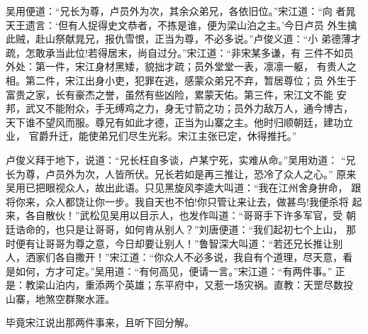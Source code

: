 吴用便道：“兄长为尊，卢员外为次，其余众弟兄，各依旧位。”宋江道：“向
者晁天王遗言：‘但有人捉得史文恭者，不拣是谁，便为梁山泊之主。’今日卢员
外生擒此贼，赴山祭献晁兄，报仇雪恨，正当为尊，不必多说。”卢俊义道：“小
弟德薄才疏，怎敢承当此位!若得居末，尚自过分。”宋江道：“非宋某多谦，有
三件不如员外处：第一件，宋江身材黑矮，貌拙才疏；员外堂堂一表，凛凛一躯，
有贵人之相。第二件，宋江出身小吏，犯罪在逃，感蒙众弟兄不弃，暂居尊位；员
外生于富贵之家，长有豪杰之誉，虽然有些凶险，累蒙天佑。第三件，宋江文不能
安邦，武又不能附众，手无缚鸡之力，身无寸箭之功；员外力敌万人，通今博古，
天下谁不望风而服。尊兄有如此才德，正当为山寨之主。他时归顺朝廷，建功立业，
官爵升迁，能使弟兄们尽生光彩。宋江主张已定，休得推托。”

卢俊义拜于地下，说道：“兄长枉自多谈，卢某宁死，实难从命。”吴用劝道：
“兄长为尊，卢员外为次，人皆所伏。兄长若如是再三推让，恐冷了众人之心。”
原来吴用已把眼视众人，故出此语。只见黑旋风李逵大叫道：“我在江州舍身拚命，
跟将你来，众人都饶让你一步。我自天也不怕!你只管让来让去，做甚鸟!我便杀将
起来，各自散伙！”武松见吴用以目示人，也发作叫道：“哥哥手下许多军官，受
朝廷诰命的，也只是让哥哥，如何肯从别人？”刘唐便道：“我们起初七个上山，
那时便有让哥哥为尊之意，今日却要让别人！”鲁智深大叫道：“若还兄长推让别
人，洒家们各自撒开！”宋江道：“你众人不必多说，我自有个道理，尽天意，看
是如何，方才可定。”吴用道：“有何高见，便请一言。”宋江道：“有两件事。”
正是：教梁山泊内，重添两个英雄；东平府中，又惹一场灾祸。直教：天罡尽数投
山寨，地煞空群聚水涯。

毕竟宋江说出那两件事来，且听下回分解。